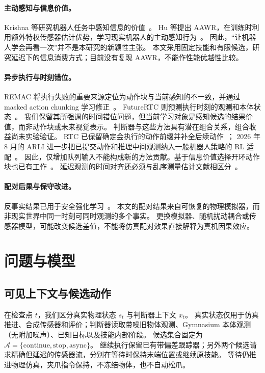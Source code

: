 \documentclass{article}
\begin{document}
\paragraph{主动感知与信息价值。}
Krishna 等研究机器人任务中感知信息的价值~\citep{krishna2025value}。
Hu 等提出 AAWR，在训练时利用额外特权传感器估计优势，学习现实机器人的主动感知行为~\citep{hu2025aawr}。
因此，“让机器人学会再看一次”并不是本研究的新颖性主张。
本文采用固定技能和有限候选，研究延迟下的信息消费方式；目前没有复现 AAWR，不能作性能优越性比较。

\paragraph{异步执行与时刻错位。}
REMAC 将执行失败的重要来源定位为动作块与当前感知的不一致，并通过 masked action chunking 学习修正~\citep{wang2026remac}。
FutureRTC 则预测执行时刻的观测和本体状态~\citep{jiang2026future}。
我们保留其所强调的时间错位问题，但当前学习对象是感知候选的结果价值，而非动作块或未来视觉表示。
判断器与这些方法具有潜在组合关系，组合收益尚未实验验证。
RTC 已保留确定会执行的动作前缀并补全后续动作~\citep{black2025rtc}；
2026 年 8 月的 ARLI 进一步把已提交动作和推理中间观测纳入一般机器人策略的 RL 适配~\citep{zhu2026arli}。
因此，仅增加队列输入不能构成新的方法贡献。基于信息价值选择开环动作块也已有工作~\citep{flaspohler2020macro}。
延迟观测的时间对齐还必须与乱序测量估计文献相区分~\citep{besada2012oosm}。

\paragraph{配对后果与保守改进。}
反事实结果已用于安全强化学习~\citep{vaskov2024harm}。
本文的配对结果来自可恢复的物理模拟器，而非现实世界中同一时刻可同时观测的多个事实。
更换模拟器、随机扰动耦合或传感器模型，可能改变候选差值，不能将仿真配对效果直接解释为真机因果效应。

\section{问题与模型}
\subsection{可见上下文与候选动作}
在检查点 $t$，我们区分真实物理状态 $s_t$ 与判断器上下文 $x_t$。
真实状态仅用于仿真推进、合成传感器和评价；判断器读取带噪旧物体观测、Gymnasium 本体观测（无附加噪声）、已知目标以及技能内部阶段。
候选集合固定为 $\mathcal{A}=\{\mathrm{continue},\mathrm{stop},\mathrm{async}\}$。
继续执行保留已有带偏差跟踪器；另外两个候选请求精确但延迟的传感器流，分别在等待时保持末端位置或继续原技能。
等待仍推进物理仿真，夹爪指令保持，不冻结物体，也不自动松爪。
\end{document}
